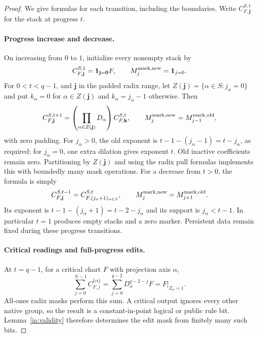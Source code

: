 \begin{proof}
We give formulas for each transition, including the boundaries.
Write $C^{S,t}_{F,\mathbf j}$ for the stack at progress $t$.

\paragraph{Progress increase and decrease.}
On increasing from $0$ to $1$, initialize every nonempty stack by
\begin{equation}
 C^{S,1}_{F,\mathbf j}
       =\mathbf1_{\mathbf j=\mathbf0}F,
 \qquad M^{\rm mark,new}_j=\mathbf1_{j=0}.         \label{ia:increase-zero}
\end{equation}
For $0<t<q-1$, and $\mathbf j$ in the padded radix range, let
$Z(\mathbf j)=\{\alpha\in S:j_\alpha=0\}$ and put
$k_\alpha=0$ for $\alpha\in Z(\mathbf j)$ and
$k_\alpha=j_\alpha-1$ otherwise.  Then
\begin{equation}
 C^{S,t+1}_{F,\mathbf j}
    =\left(\prod_{\alpha\in Z(\mathbf j)}D_\alpha\right)
           C^{S,t}_{F,\mathbf k},\qquad
 M^{\rm mark,new}_j=M^{\rm mark,old}_{j-1},       \label{ia:increase-positive}
\end{equation}
with zero padding.  For $j_\alpha>0$, the old exponent is
$t-1-(j_\alpha-1)=t-j_\alpha$, as required; for $j_\alpha=0$,
one extra dilation gives exponent $t$.  Old inactive coefficients
remain zero.  Partitioning by $Z(\mathbf j)$ and using the radix
pull formulas implements this with boundedly many mask operations.
For a decrease from $t>0$, the formula is simply
\begin{equation}
 C^{S,t-1}_{F,\mathbf j}
     =C^{S,t}_{F,(j_\alpha+1)_{\alpha\in S}},\qquad
 M^{\rm mark,new}_j=M^{\rm mark,old}_{j+1}.       \label{ia:decrease}
\end{equation}
Its exponent is $t-1-(j_\alpha+1)=t-2-j_\alpha$ and its support
is $j_\alpha<t-1$.  In particular $t=1$ produces empty stacks
and a zero marker.  Persistent data remain fixed during these
progress transitions.

\paragraph{Critical readings and full-progress edits.}
At $t=q-1$, for a critical chart $F$ with projection axis $\alpha$,
\begin{equation}
 \sum_{j=0}^{N-1}C^{\{\alpha\}}_{F,j}
     =\sum_{j=0}^{q-2}D_\alpha^{q-2-j}F
     =F\big|_{Z_\alpha=1}.                       \label{ia:critical-projection}
\end{equation}
All-ones radix masks perform this sum.  A critical output ignores
every other native group, so the result is a constant-in-point
logical or public rule bit.  Lemma~\ref{ia:validity} therefore
determines the edit mask from finitely many such bits.


\end{proof}
